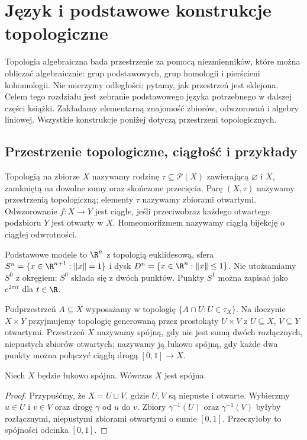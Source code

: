 \chapter{Język i podstawowe konstrukcje topologiczne}
\label{ch:wstep-topologia}

Topologia algebraiczna bada przestrzenie za pomocą niezmienników, które można
obliczać algebraicznie: grup podstawowych, grup homologii i pierścieni
kohomologii. Nie mierzymy odległości; pytamy, jak przestrzeń jest sklejona.
Celem tego rozdziału jest zebranie podstawowego języka potrzebnego w dalszej
części książki. Zakładamy elementarną znajomość zbiorów, odwzorowań i algebry
liniowej. Wszystkie konstrukcje poniżej dotyczą przestrzeni topologicznych.

\section{Przestrzenie topologiczne, ciągłość i przykłady}

\begin{definicja}
Topologią na zbiorze $X$ nazywamy rodzinę $\tau\subseteq\mathcal P(X)$
zawierającą $\varnothing$ i $X$, zamkniętą na dowolne sumy oraz skończone
przecięcia. Parę $(X,\tau)$ nazywamy przestrzenią topologiczną; elementy
$\tau$ nazywamy zbiorami otwartymi. Odwzorowanie $f:X\to Y$ jest ciągłe,
jeśli przeciwobraz każdego otwartego podzbioru $Y$ jest otwarty w $X$.
Homeomorfizmem nazywamy ciągłą bijekcję o ciągłej odwrotności.
\end{definicja}

\begin{przyklad}
Podstawowe modele to $\R^n$ z topologią euklidesową, sfera
$S^n=\{x\in\R^{n+1}:\|x\|=1\}$ i dysk $D^n=\{x\in\R^n:\|x\|\leq1\}$.
Nie utożsamiamy $S^0$ z okręgiem: $S^0$ składa się z dwóch punktów.
Punkty $S^1$ można zapisać jako $e^{2\pi it}$ dla $t\in\R$.
\end{przyklad}

\begin{definicja}
Podprzestrzeń $A\subseteq X$ wyposażamy w topologię $\{A\cap U:U\in\tau_X\}$.
Na iloczynie $X\times Y$ przyjmujemy topologię generowaną przez prostokąty
$U\times V$ z $U\subseteq X$, $V\subseteq Y$ otwartymi. Przestrzeń $X$
nazywamy spójną, gdy nie jest sumą dwóch rozłącznych, niepustych zbiorów
otwartych; nazywamy ją łukowo spójną, gdy każde dwa punkty można połączyć
ciągłą drogą $[0,1]\to X$.
\end{definicja}

\begin{stwierdzenie}
Niech $X$ będzie łukowo spójna. Wówczas $X$ jest spójna.
\end{stwierdzenie}
\begin{proof}
Przypuśćmy, że $X=U\sqcup V$, gdzie $U,V$ są niepuste i otwarte.
Wybierzmy $u\in U$ i $v\in V$ oraz drogę $\gamma$ od $u$ do $v$.
Zbiory $\gamma^{-1}(U)$ oraz $\gamma^{-1}(V)$ byłyby rozłącznymi,
niepustymi zbiorami otwartymi o sumie $[0,1]$. Przeczyłoby to spójności
odcinka $[0,1]$.
\end{proof}

